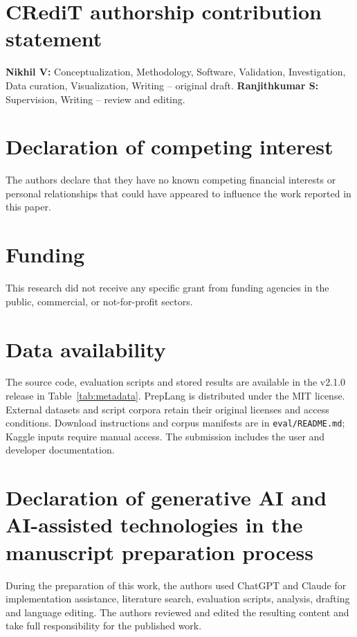 \documentclass[preprint,12pt,a4paper]{elsarticle}  %
\begin{document}


\section*{CRediT authorship contribution statement}
\textbf{Nikhil V:} Conceptualization, Methodology, Software, Validation, Investigation, Data curation,
Visualization, Writing -- original draft. \textbf{Ranjithkumar S:} Supervision, Writing -- review and
editing.

\section*{Declaration of competing interest}
The authors declare that they have no known competing financial interests or personal relationships that
could have appeared to influence the work reported in this paper.

\section*{Funding}
This research did not receive any specific grant from funding agencies in the public, commercial, or
not-for-profit sectors.

\section*{Data availability}
The source code, evaluation scripts and stored results are available in the v2.1.0 release in
Table~\ref{tab:metadata}. PrepLang is distributed under the MIT license. External datasets and script
corpora retain their original licenses and access conditions. Download instructions and corpus
manifests are in \texttt{eval/README.md}; Kaggle inputs require manual access. The submission includes
the user and developer documentation.

\section*{Declaration of generative AI and AI-assisted technologies in the manuscript preparation process}
During the preparation of this work, the authors used ChatGPT and Claude for implementation assistance,
literature search, evaluation scripts, analysis, drafting and language editing. The authors reviewed and
edited the resulting content and take full responsibility for the published work.


\end{document}
